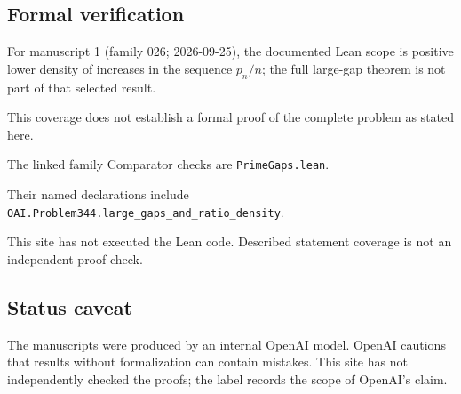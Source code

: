 \documentclass[11pt]{article}
\begin{document}
\subsection{Formal verification}
For manuscript 1 (family 026; 2026-09-25), the documented Lean scope is positive lower density of increases in the sequence $p_n/n$; the full large-gap theorem is not part of that selected result.

This coverage does not establish a formal proof of the complete problem as stated here.

The linked family Comparator checks are \texttt{PrimeGaps.lean}.

Their named declarations include \texttt{OAI.Problem344.large\_gaps\_and\_ratio\_density}.

This site has not executed the Lean code. Described statement coverage is not an independent proof check.

\subsection{Status caveat}
The manuscripts were produced by an internal OpenAI model. OpenAI cautions that results without formalization can contain mistakes. This site has not independently checked the proofs; the label records the scope of OpenAI's claim.
\end{document}
